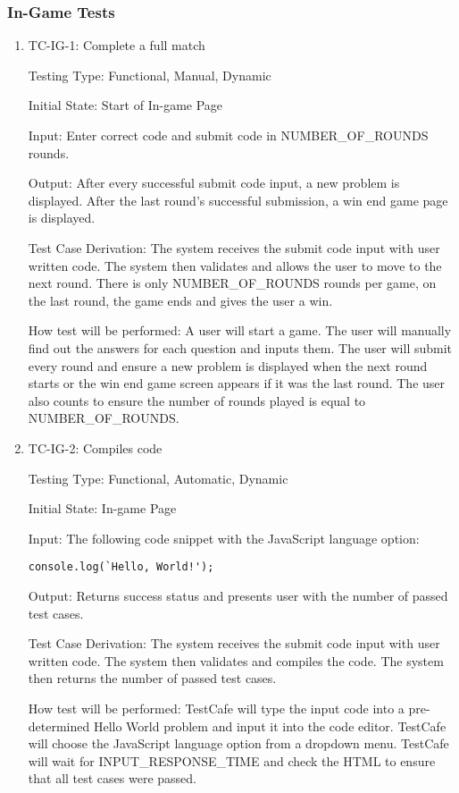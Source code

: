 \documentclass[12pt, titlepage]{article}
\begin{document}
\subsubsection{In-Game Tests}

\begin{enumerate}

\item{TC-IG-1: Complete a full match}

Testing Type: Functional, Manual, Dynamic
					
Initial State: Start of In-game Page
					
Input: Enter correct code and submit code in NUMBER\_OF\_ROUNDS rounds.
					
Output: After every successful submit code input, a new problem is displayed. After the last round's successful submission, a win end game page is displayed.

Test Case Derivation: The system receives the submit code input with user written code. The system then validates and allows the user to move to the next round. There is only NUMBER\_OF\_ROUNDS rounds per game, on the last round, the game ends and gives the user a win.
					
How test will be performed: A user will start a game. The user will manually find out the answers for each question and inputs them. The user will submit every round and ensure a new problem is displayed when the next round starts or the win end game screen appears if it was the last round. The user also counts to ensure the number of rounds played is equal to NUMBER\_OF\_ROUNDS.

\item{TC-IG-2: Compiles code}

Testing Type: Functional, Automatic, Dynamic
					
Initial State: In-game Page
					
Input: The following code snippet with the JavaScript language option:
\begin{verbatim}
console.log(`Hello, World!');
\end{verbatim}
					
Output: Returns success status and presents user with the number of passed test cases.

Test Case Derivation: The system receives the submit code input with user written code. The system then validates and compiles the code. The system then returns the number of passed test cases.
					
How test will be performed: TestCafe will type the input code into a pre-determined Hello World problem and input it into the code editor. TestCafe will choose the JavaScript language option from a dropdown menu. TestCafe will wait for INPUT\_RESPONSE\_TIME and check the HTML to ensure that all test cases were passed.


\end{enumerate}
\end{document}
